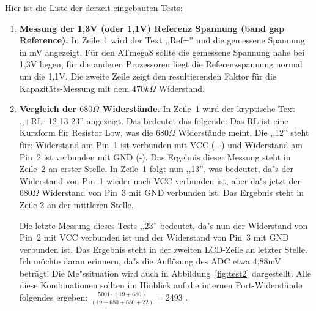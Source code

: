 \vspace{1cm}
Hier ist die Liste der derzeit eingebauten Tests:
\vspace{1cm}
\begin{enumerate}
\item {\bf Messung der 1,3V (oder 1,1V) Referenz Spannung (band gap Reference).} In Zeile~1 wird der Text ,,Ref='' und die
gemessene Spannung in mV angezeigt.
F\"ur den ATmega8 sollte die gemessene Spannung nahe bei 1,3V liegen, f\"ur die anderen Prozessoren liegt
die Referenzspannung normal um die 1,1V.
Die zweite Zeile zeigt den resultierenden Faktor f\"ur die Kapazit\"ats-Messung mit dem \(470k\Omega\) Widerstand.
\item {\bf Vergleich der \(680\Omega\) Widerst\"ande.} 
In Zeile~1 wird der kryptische Text  ,,+RL- 12 13 23'' angezeigt. Das bedeutet das folgende:
Das RL ist eine Kurzform f\"ur Resistor Low, was die \(680\Omega\) Widerst\"ande meint. Die ,,12'' steht f\"ur: 
Widerstand am Pin~1 ist verbunden mit VCC (+) und Widerstand am Pin~2 ist verbunden mit GND (-). 
Das Ergebnis dieser Messung steht in Zeile~2 an erster Stelle.
 In Zeile~1 folgt nun ,,13'', was bedeutet, da"s der Widerstand von Pin~1 wieder nach VCC verbunden ist,
aber da"s jetzt der \(680\Omega\) Widerstand von Pin~3  mit GND verbunden ist.
Das Ergebnis steht in Zeile 2 an der mittleren Stelle.

Die letzte Messung dieses Tests ,,23'' bedeutet, da"s nun der Widerstand von Pin~2 mit VCC verbunden ist und
der Widerstand von Pin~3 mit GND verbunden ist.
Das Ergebnis steht in der zweiten LCD-Zeile an letzter Stelle.
Ich m\"ochte daran erinnern, da"s die Aufl\"osung des ADC etwa 4,88mV betr\"agt!
Die Me"ssituation wird auch in Abbildung~\ref{fig:test2} dargestellt.
Alle diese Kombinationen sollten im Hinblick auf die internen Port-Widerst\"ande folgendes ergeben:
\(\frac{5001 \cdot  (19+680)}{ (19+680+680+22)} = 2493\) .


\end{enumerate}
